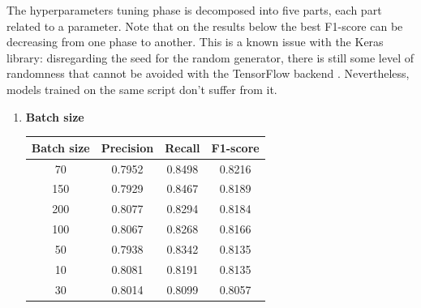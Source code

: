 The hyperparameters tuning phase is decomposed into five parts, each part related to a parameter. Note that on the results below the best F1-score can be decreasing from one phase to another. This is a known issue with the Keras library: disregarding the seed for the random generator, there is still some level of randomness that cannot be avoided with the TensorFlow backend \cite{keras:seed-issue-blog,keras:seed-issue-github}. Nevertheless, models trained on the same script don't suffer from it.


\begin{enumerate}

    \item \textbf{Batch size} \\
        \vspace{-1cm}
        \begin{table}[htbp]
            \centering
            \begin{tabular}{c|c|c|c}
            \textbf{Batch size} & \textbf{Precision} & \textbf{Recall} & \textbf{F1-score} \\ \hline
                70      &	0.7952    &	0.8498    &	0.8216 \\
                150     &	0.7929    &	0.8467    &	0.8189 \\
                200     &	0.8077    &	0.8294    &	0.8184 \\
                100     &	0.8067    &	0.8268    &	0.8166 \\
                50      &	0.7938    &	0.8342    &	0.8135 \\
                10      &	0.8081    &	0.8191    &	0.8135 \\
                30      &	0.8014    &	0.8099    &	0.8057 \\
            \end{tabular}
        \end{table}        
    



\end{enumerate}
